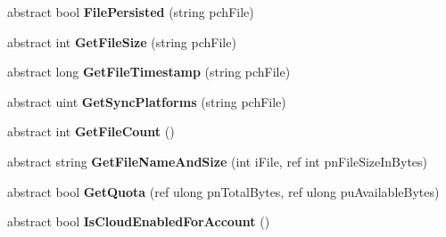 \begin{DoxyCompactItemize}
\item 
\mbox{\label{class_valve_1_1_steamworks_1_1_i_steam_remote_storage_a5bf566aa6de45bc2169702fea3beb7af}} 
abstract bool {\bfseries File\+Persisted} (string pch\+File)
\item 
\mbox{\label{class_valve_1_1_steamworks_1_1_i_steam_remote_storage_a4c592cddfca279b060e5029f16f50ff3}} 
abstract int {\bfseries Get\+File\+Size} (string pch\+File)
\item 
\mbox{\label{class_valve_1_1_steamworks_1_1_i_steam_remote_storage_a416cc166148a563e4d05e9f1beddd6c8}} 
abstract long {\bfseries Get\+File\+Timestamp} (string pch\+File)
\item 
\mbox{\label{class_valve_1_1_steamworks_1_1_i_steam_remote_storage_a0bf0c3079854a03694811d583542b7b0}} 
abstract uint {\bfseries Get\+Sync\+Platforms} (string pch\+File)
\item 
\mbox{\label{class_valve_1_1_steamworks_1_1_i_steam_remote_storage_a7a5e87586d697646f4cf396d57cc16d1}} 
abstract int {\bfseries Get\+File\+Count} ()
\item 
\mbox{\label{class_valve_1_1_steamworks_1_1_i_steam_remote_storage_ac5e1b6b74051170da5670c5c95a39b9b}} 
abstract string {\bfseries Get\+File\+Name\+And\+Size} (int i\+File, ref int pn\+File\+Size\+In\+Bytes)
\item 
\mbox{\label{class_valve_1_1_steamworks_1_1_i_steam_remote_storage_a44e7e7bda9d05159c224b7a4f4ecd733}} 
abstract bool {\bfseries Get\+Quota} (ref ulong pn\+Total\+Bytes, ref ulong pu\+Available\+Bytes)
\item 
\mbox{\label{class_valve_1_1_steamworks_1_1_i_steam_remote_storage_a645aba33ffcad87d1ac5e39daff7a6d1}} 
abstract bool {\bfseries Is\+Cloud\+Enabled\+For\+Account} ()
\item 

\end{DoxyCompactItemize}

